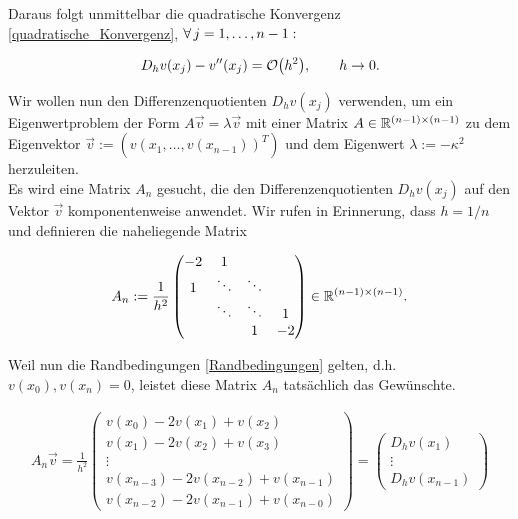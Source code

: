 Daraus folgt unmittelbar die quadratische Konvergenz \eqref{quadratische_Konvergenz}, $\forall \, j = 1, \ldots, n-1:$

\begin{align*}
  D_h v(x_j) - v^{\prime \prime}(x_j) = \mathcal{O} {\left ( h^2 \right )}, \qquad
  h \to 0.
\end{align*}

Wir wollen nun den Differenzenquotienten $D_h v(x_j)$ verwenden, um ein Eigenwertproblem der Form $A \vec v = \lambda \vec v$ mit einer Matrix $A \in \mathbb{R}^{(n-1) \times (n-1)}$ zu dem Eigenvektor $\vec v := (v(x_1, \ldots, v(x_{n-1}))^T)$ und dem Eigenwert $\lambda := -\kappa^2$ herzuleiten. \\

Es wird eine Matrix $A_n$ gesucht, die den Differenzenquotienten $D_h v(x_j)$ auf den Vektor $\vec v$ komponentenweise anwendet. Wir rufen in Erinnerung, dass $h = 1/n$ und definieren die naheliegende Matrix

\begin{align*}
  A_n :=
  \frac{1}{h^2}
  \begin{pmatrix}
    -2 &  1      &        &    \\
     1 &  \ddots & \ddots &    \\
       &  \ddots & \ddots &  1 \\
       &         & 1      & -2
  \end{pmatrix}
  \in \mathbb{R}^{(n-1) \times (n-1)}.
\end{align*}

Weil nun die Randbedingungen \eqref{Randbedingungen} gelten, d.h. $v(x_0), v(x_n) = 0$, leistet diese Matrix $A_n$ tatsächlich das Gewünschte.

\begin{align*}
  A_n \vec v =
  \frac{1}{h^2}
  \begin{pmatrix}
    v(x_0) - 2 v(x_1) + v(x_2)             \\
    v(x_1) - 2 v(x_2) + v(x_3)             \\
    \vdots                                 \\
    v(x_{n-3}) - 2 v(x_{n-2}) + v(x_{n-1}) \\
    v(x_{n-2}) - 2 v(x_{n-1}) + v(x_{n-0})
  \end{pmatrix} =
  \begin{pmatrix}
    D_h v(x_1) \\
    \vdots     \\
    D_h v(x_{n-1})
  \end{pmatrix}
\end{align*}

